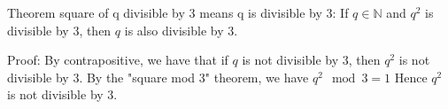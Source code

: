 Theorem square of q divisible by 3 means q is divisible by 3: If $q \in \mathbb{N}$ and $q^2$ is divisible by $3$, then $q$ is also divisible by $3$.


Proof:
By contrapositive, we have that if $q$ is not divisible by $3$, then $q^2$ is not divisible by $3$.
By the "square mod 3" theorem, we have $q^2 \mod 3 = 1$
Hence $q^2$ is not divisible by $3$.